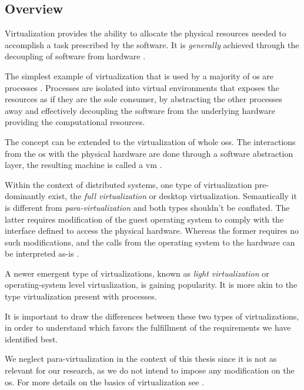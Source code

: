 \documentclass[12pt, titlepage]{uo_temp}
\begin{document}
     \subsection{Overview}
     Virtualization provides the ability to
     allocate the physical resources needed to accomplish a task prescribed by the software.
     It is \emph{generally} achieved through the decoupling of software from hardware
     \cite{tavangarian2012virtual}.

     The simplest example of virtualization that is used by a majority of \gls{os} are
     processes \cite{chisnall2008definitive}. Processes are isolated into virtual
     environments that exposes the resources as if they are the sole consumer, by
     abstracting the other processes away and effectively decoupling the software from the
     underlying hardware providing the computational resources.

     The concept can be extended to the virtualization of whole \gls{os}s. The
     interactions from the \gls{os} with the physical hardware are done through a software
     abstraction layer, the resulting machine is called a \gls{vm}
     \cite{semnanian2011virtualization}.

     Within the context of distributed systems, one type of virtualization pre-dominantly
     exist, the \emph{full virtualization} or desktop virtualization. Semantically it is
     different from \emph{para-virtualization} and both types shouldn't be conflated. The
     latter requires modification of the guest operating system to comply with the
     interface defined to access the physical hardware. Whereas the former requires no
     such modifications, and the calls from the operating system to the hardware can be
     interpreted as-is \cite{tavangarian2012virtual}.

     A newer emergent type of virtualizations, known as \emph{light virtualization} or
     operating-system level virtualization, is gaining popularity. It is more akin to
     the type virtualization present with processes. 
   
     It is important to draw the differences between these two types of virtualizations,
     in order to understand which favors the fulfillment of the requirements we have
     identified best.
     
     We neglect para-virtualization in the context of this thesis since it is not as
     relevant for our research, as we do not intend to impose any modification on the
     \gls{os}. For more details on the basics of virtualization see
     \cite{tavangarian2012virtual} \cite{barham2003xen}.
  
\end{document}
